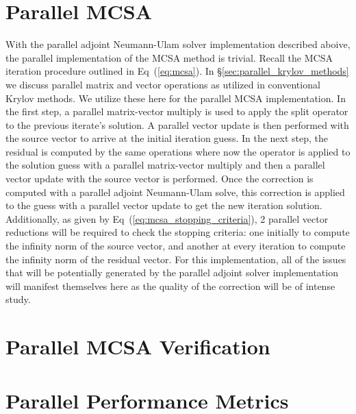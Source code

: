 \section{Parallel MCSA\ }
\label{sec:parallel_mcsa}
With the parallel adjoint Neumann-Ulam solver implementation described
aboive, the parallel implementation of the MCSA method is
trivial. Recall the MCSA iteration procedure outlined in
Eq~(\ref{eq:mcsa}). In \S\ref{sec:parallel_krylov_methods} we discuss
parallel matrix and vector operations as utilized in conventional
Krylov methods. We utilize these here for the parallel MCSA
implementation. In the first step, a parallel matrix-vector multiply
is used to apply the split operator to the previous iterate's
solution. A parallel vector update is then performed with the source
vector to arrive at the initial iteration guess. In the next step, the
residual is computed by the same operations where now the operator is
applied to the solution guess with a parallel matrix-vector multiply
and then a parallel vector update with the source vector is
performed. Once the correction is computed with a parallel adjoint
Neumann-Ulam solve, this correction is applied to the guess with a
parallel vector update to get the new iteration
solution. Additionally, as given by
Eq~(\ref{eq:mcsa_stopping_criteria}), 2 parallel vector reductions
will be required to check the stopping criteria: one initially to
compute the infinity norm of the source vector, and another at every
iteration to compute the infinity norm of the residual vector. For
this implementation, all of the issues that will be potentially
generated by the parallel adjoint solver implementation will manifest
themselves here as the quality of the correction will be of intense
study.

\section{Parallel MCSA Verification\ }
\label{sec:parallel_verification}

\section{Parallel Performance Metrics\ }
\label{sec:parallel_performance_metrics}

